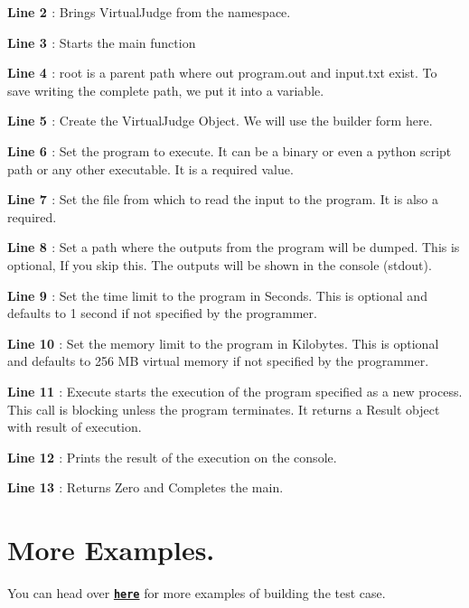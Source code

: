{\bfseries{Line 2 }} \+: Brings Virtual\+Judge from the namespace.

{\bfseries{Line 3 }} \+: Starts the main function

{\bfseries{Line 4 }} \+: root is a parent path where out {\ttfamily program.\+out} and {\ttfamily input.\+txt} exist. To save writing the complete path, we put it into a variable.

{\bfseries{Line 5 }} \+: Create the Virtual\+Judge Object. We will use the builder form here.

{\bfseries{Line 6 }} \+: Set the program to execute. It can be a binary or even a python script path or any other executable. It is a required value.

{\bfseries{Line 7 }} \+: Set the file from which to read the input to the program. It is also a required.

{\bfseries{Line 8 }} \+: Set a path where the outputs from the program will be dumped. This is optional, If you skip this. The outputs will be shown in the console (stdout).

{\bfseries{Line 9 }} \+: Set the time limit to the program in Seconds. This is optional and defaults to 1 second if not specified by the programmer.

{\bfseries{Line 10 }} \+: Set the memory limit to the program in Kilobytes. This is optional and defaults to 256 MB virtual memory if not specified by the programmer.

{\bfseries{Line 11 }} \+: Execute starts the execution of the program specified as a new process. This call is blocking unless the program terminates. It returns a Result object with result of execution.

{\bfseries{Line 12 }} \+: Prints the result of the execution on the console.

{\bfseries{Line 13 }} \+: Returns Zero and Completes the main.

\DoxyHorRuler
\hypertarget{index_more_example}{}\section{More Examples.}\label{index_more_example}
You can head over \href{https://github.com/coder3101/testcaser/tree/master/examples}{\texttt{ {\bfseries{here}}}} for more examples of building the test case. 